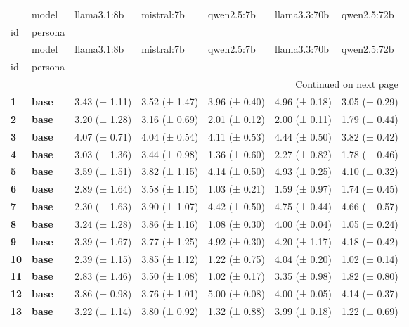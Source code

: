 \begin{longtable}{lllllll}
\toprule
 & model & llama3.1:8b & mistral:7b & qwen2.5:7b & llama3.3:70b & qwen2.5:72b \\
id & persona &  &  &  &  &  \\
\midrule
\endfirsthead
\toprule
 & model & llama3.1:8b & mistral:7b & qwen2.5:7b & llama3.3:70b & qwen2.5:72b \\
id & persona &  &  &  &  &  \\
\midrule
\endhead
\midrule
\multicolumn{7}{r}{Continued on next page} \\
\midrule
\endfoot
\bottomrule
\endlastfoot
\textbf{1} & \textbf{base} & 3.43 (± 1.11) & 3.52 (± 1.47) & 3.96 (± 0.40) & 4.96 (± 0.18) & 3.05 (± 0.29) \\
\cline{1-7}
\textbf{2} & \textbf{base} & 3.20 (± 1.28) & 3.16 (± 0.69) & 2.01 (± 0.12) & 2.00 (± 0.11) & 1.79 (± 0.44) \\
\cline{1-7}
\textbf{3} & \textbf{base} & 4.07 (± 0.71) & 4.04 (± 0.54) & 4.11 (± 0.53) & 4.44 (± 0.50) & 3.82 (± 0.42) \\
\cline{1-7}
\textbf{4} & \textbf{base} & 3.03 (± 1.36) & 3.44 (± 0.98) & 1.36 (± 0.60) & 2.27 (± 0.82) & 1.78 (± 0.46) \\
\cline{1-7}
\textbf{5} & \textbf{base} & 3.59 (± 1.51) & 3.82 (± 1.15) & 4.14 (± 0.50) & 4.93 (± 0.25) & 4.10 (± 0.32) \\
\cline{1-7}
\textbf{6} & \textbf{base} & 2.89 (± 1.64) & 3.58 (± 1.15) & 1.03 (± 0.21) & 1.59 (± 0.97) & 1.74 (± 0.45) \\
\cline{1-7}
\textbf{7} & \textbf{base} & 2.30 (± 1.63) & 3.90 (± 1.07) & 4.42 (± 0.50) & 4.75 (± 0.44) & 4.66 (± 0.57) \\
\cline{1-7}
\textbf{8} & \textbf{base} & 3.24 (± 1.28) & 3.86 (± 1.16) & 1.08 (± 0.30) & 4.00 (± 0.04) & 1.05 (± 0.24) \\
\cline{1-7}
\textbf{9} & \textbf{base} & 3.39 (± 1.67) & 3.77 (± 1.25) & 4.92 (± 0.30) & 4.20 (± 1.17) & 4.18 (± 0.42) \\
\cline{1-7}
\textbf{10} & \textbf{base} & 2.39 (± 1.15) & 3.85 (± 1.12) & 1.22 (± 0.75) & 4.04 (± 0.20) & 1.02 (± 0.14) \\
\cline{1-7}
\textbf{11} & \textbf{base} & 2.83 (± 1.46) & 3.50 (± 1.08) & 1.02 (± 0.17) & 3.35 (± 0.98) & 1.82 (± 0.80) \\
\cline{1-7}
\textbf{12} & \textbf{base} & 3.86 (± 0.98) & 3.76 (± 1.01) & 5.00 (± 0.08) & 4.00 (± 0.05) & 4.14 (± 0.37) \\
\cline{1-7}
\textbf{13} & \textbf{base} & 3.22 (± 1.14) & 3.80 (± 0.92) & 1.32 (± 0.88) & 3.99 (± 0.18) & 1.22 (± 0.69) \\

\end{longtable}
